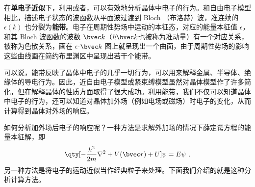 
在\textbf{单电子近似}下，利用或者，可以有效地分析晶体中电子的行为。和自由电子模型相比，描述电子状态的波函数从平面波过渡到 Bloch （布洛赫）波，准连续的 $\epsilon(k)$ 也分裂为\textbf{能带}。电子在周期性势场中运动的本征态，对应的能量本征值 $\epsilon$，和其 Bloch 波函数的波数 $\bvec k$（$\hbar \bvec k$也被称为准动量）有一个对应关系，被称为色散关系，画在 $\epsilon$-${\bvec k}$ 图上就呈现出一个曲面，由于周期性势场的影响这些曲线画在简约布里渊区中呈现出若干个能带。

可以说，能带反映了晶体中电子的几乎一切行为，可以用来解释金属、半导体、绝缘体的导电行为。因此，近自由电子模型或紧束缚模型虽然对晶体模型作了许多简化，但在解释晶体的性质方面取得了很大成功。利用能带，我们不仅可以知道晶体中电子的行为，还可以知道对晶体加外场（例如电场或磁场）时电子的变化，从而计算得到晶体对外场的响应。

如何分析加外场后电子的响应呢？一种方法是求解外加场的情况下薛定谔方程的能量本征解，即
\begin{equation}
\qty[-\frac{\hbar^2}{2m}\nabla^2+V(\bvec r)+U]\psi = E\psi~,
\end{equation}
另一种方法是将电子的运动近似当作经典粒子来处理。下面我们介绍的就是这种分析计算方法。
